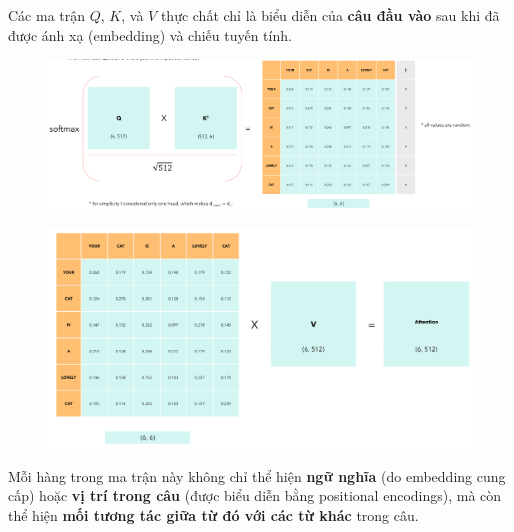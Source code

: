 \documentclass{book}
\begin{document}
            Các ma trận \( Q \), \( K \), và \( V \) thực chất chỉ là biểu diễn của \textbf{câu đầu vào} sau khi đã được ánh xạ (embedding) và chiếu tuyến tính.
            \begin{figure}[H]
                \centering
                \includegraphics[width=1.0\linewidth]{images/12d_10.png}
        
            \end{figure}
            \begin{figure}[H]
                \centering
                \includegraphics[width=0.9\linewidth]{images/12d_11.png}
        
            \end{figure}
            Mỗi hàng trong ma trận này không chỉ thể hiện \textbf{ngữ nghĩa} (do embedding cung cấp) hoặc \textbf{vị trí trong câu} (được biểu diễn bằng positional encodings), mà còn thể hiện \textbf{mối tương tác giữa từ đó với các từ khác} trong câu.
            
            \bigskip
            
\end{document}
